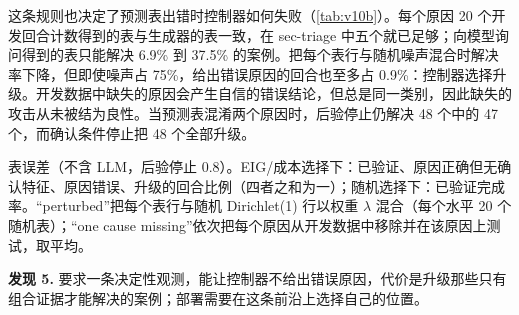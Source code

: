 这条规则也决定了预测表出错时控制器如何失败（\cref{tab:v10b}）。每个原因 20 个开发回合计数得到的表与生成器的表一致，在 sec-triage 中五个就已足够；向模型询问得到的表只能解决 6.9\% 到 37.5\% 的案例。把每个表行与随机噪声混合时解决率下降，但即使噪声占 75\%，给出错误原因的回合也至多占 0.9\%：控制器选择升级。开发数据中缺失的原因会产生自信的错误结论，但总是同一类别，因此缺失的攻击从未被结为良性。当预测表混淆两个原因时，后验停止仍解决 48 个中的 47 个，而确认条件停止把 48 个全部升级。

\begin{table}[t]
  \caption{表误差（不含 LLM，后验停止 0.8）。EIG/成本选择下：已验证、原因正确但无确认特征、原因错误、升级的回合比例（四者之和为一）；随机选择下：已验证完成率。“perturbed”把每个表行与随机 Dirichlet(1) 行以权重 $\lambda$ 混合（每个水平 20 个随机表）；“one cause missing”依次把每个原因从开发数据中移除并在该原因上测试，取平均。}
  \label{tab:v10b}
  \centering\small
  \begin{adjustbox}{max width=\textwidth}\end{adjustbox}
\end{table}

\smallskip\noindent\textbf{发现 5.} 要求一条决定性观测，能让控制器不给出错误原因，代价是升级那些只有组合证据才能解决的案例；部署需要在这条前沿上选择自己的位置。
